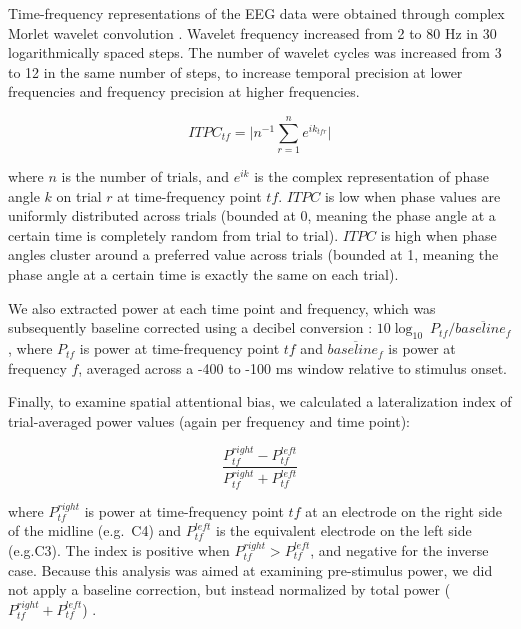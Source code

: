 \documentclass[11pt,]{memoir}
\begin{document}
Time-frequency representations of the EEG data were obtained through complex Morlet wavelet convolution \autocite{Cohen2014}. Wavelet frequency increased from 2 to 80 Hz in 30 logarithmically spaced steps. The number of wavelet cycles was increased from 3 to 12 in the same number of steps, to increase temporal precision at lower frequencies and frequency precision at higher frequencies.

\begin{equation*}
  ITPC_{tf} = \lvert n^{-1} \sum_{r=1}^{n} e^{ik_{tfr}} \rvert
\end{equation*}

\noindent where \(n\) is the number of trials, and \(e^{ik}\) is the complex representation of phase angle \(k\) on trial \(r\) at time-frequency point \(tf\). \(ITPC\) is low when phase values are uniformly distributed across trials (bounded at 0, meaning the phase angle at a certain time is completely random from trial to trial). \(ITPC\) is high when phase angles cluster around a preferred value across trials (bounded at 1, meaning the phase angle at a certain time is exactly the same on each trial).

We also extracted power at each time point and frequency, which was subsequently baseline corrected using a decibel conversion \autocite{Cohen2014}: \(10\log_{10}\ P_{tf}/\overline{baseline_f}\), where \(P_{tf}\) is power at time-frequency point \(tf\) and \(\overline{baseline_f}\) is power at frequency \(f\), averaged across a -400 to -100 ms window relative to stimulus onset.

Finally, to examine spatial attentional bias, we calculated a lateralization index of trial-averaged power values (again per frequency and time point):

\begin{equation*}
  \frac{P_{tf}^{right} - P_{tf}^{left}}{P_{tf}^{right} + P_{tf}^{left}}
\end{equation*}

\noindent where \(P_{tf}^{right}\) is power at time-frequency point \(tf\) at an electrode on the right side of the midline (e.g.~C4) and \(P_{tf}^{left}\) is the equivalent electrode on the left side (e.g.C3). The index is positive when
\(P_{tf}^{right} > P_{tf}^{left}\), and negative for the inverse case. Because this analysis was aimed at examining pre-stimulus power, we did not apply a baseline correction, but instead normalized by total power (\(P_{tf}^{right} + P_{tf}^{left}\)) \autocite[cf.][]{Handel2011}.
\end{document}
